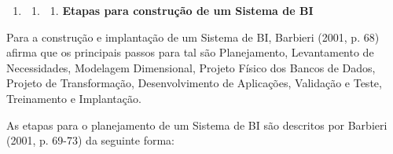 \documentclass[a4paper]{article}
\newcounter{saveenum}
\newcommand\liststyleWWviiiNumi{%
\renewcommand\theenumi{\arabic{enumi}}
\renewcommand\theenumii{\arabic{enumi}.\arabic{enumii}}
\renewcommand\theenumiii{\arabic{enumi}.\arabic{enumii}.\arabic{enumiii}}
\renewcommand\theenumiv{\arabic{enumi}.\arabic{enumii}.\arabic{enumiii}.\arabic{enumiv}}
\renewcommand\labelenumi{\theenumi}
\renewcommand\labelenumii{\theenumii}
\renewcommand\labelenumiii{\theenumiii}
\renewcommand\labelenumiv{\theenumiv.}
}
\begin{document}
\bigskip

\liststyleWWviiiNumi
\setcounter{saveenum}{\value{enumi}}
\begin{enumerate}
\setcounter{enumi}{\value{saveenum}}
\item \setcounter{saveenum}{\value{enumii}}
\begin{enumerate}
\setcounter{enumii}{\value{saveenum}}
\item \setcounter{saveenum}{\value{enumiii}}
\begin{enumerate}
\setcounter{enumiii}{\value{saveenum}}
\item {\sffamily\bfseries
Etapas para constru\c{c}\~ao de um Sistema de BI}
\end{enumerate}
\end{enumerate}
\end{enumerate}
{
\textsf{Para a constru\c{c}\~ao e implanta\c{c}\~ao de um Sistema de BI, Barbieri (2001, p. 68) afirma que os principais
passos para tal s\~ao Planejamento, Levantamento de Necessidades, Modelagem Dimensional, Projeto F\'isico dos Bancos de
Dados, Projeto de Transforma\c{c}\~ao, Desenvolvimento de Aplica\c{c}\~oes, Valida\c{c}\~ao e Teste, Treinamento e
Implanta\c{c}\~ao.}}

{
\textsf{As etapas para o planejamento de um Sistema de BI s\~ao descritos por Barbieri (2001, p. 69-73) da seguinte
forma:}}
\end{document}
